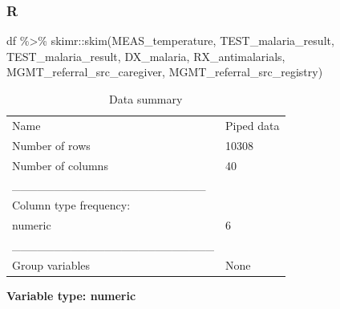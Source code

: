 \documentclass[
  letterpaper,
  DIV=11,
  numbers=noendperiod,
  oneside]{scrreprt}
\newenvironment{Shaded}{\begin{snugshade}}{\end{snugshade}}
\newcommand{\FunctionTok}[1]{\textcolor[rgb]{0.28,0.35,0.67}{#1}}
\newcommand{\NormalTok}[1]{\textcolor[rgb]{0.00,0.23,0.31}{#1}}
\newcommand{\SpecialCharTok}[1]{\textcolor[rgb]{0.37,0.37,0.37}{#1}}
\begin{document}
\subsubsection{R}

\begin{Shaded}
\begin{Highlighting}[]
\NormalTok{df }\SpecialCharTok{\%\textgreater{}\%}
\NormalTok{  skimr}\SpecialCharTok{::}\FunctionTok{skim}\NormalTok{(MEAS\_temperature,}
\NormalTok{              TEST\_malaria\_result,}
\NormalTok{              TEST\_malaria\_result,}
\NormalTok{              DX\_malaria,}
\NormalTok{              RX\_antimalarials,}
\NormalTok{              MGMT\_referral\_src\_caregiver,}
\NormalTok{              MGMT\_referral\_src\_registry)}
\end{Highlighting}
\end{Shaded}

\begin{longtable}[]{@{}ll@{}}
\caption{Data summary}\tabularnewline
\toprule\noalign{}
\endfirsthead
\endhead
\bottomrule\noalign{}
\endlastfoot
Name & Piped data \\
Number of rows & 10308 \\
Number of columns & 40 \\
\_\_\_\_\_\_\_\_\_\_\_\_\_\_\_\_\_\_\_\_\_\_\_ & \\
Column type frequency: & \\
numeric & 6 \\
\_\_\_\_\_\_\_\_\_\_\_\_\_\_\_\_\_\_\_\_\_\_\_\_ & \\
Group variables & None \\
\end{longtable}

\textbf{Variable type: numeric}
\end{document}
